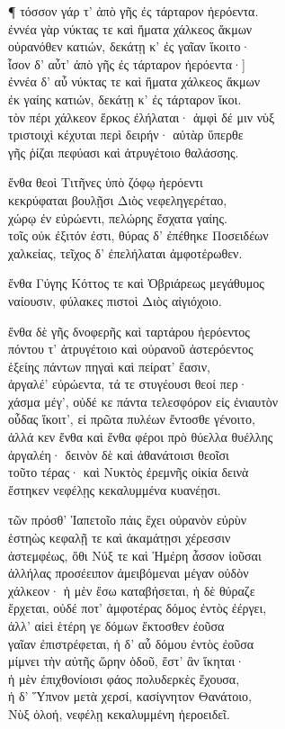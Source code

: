 ¶ τόσσον γάρ τ' ἀπὸ γῆς ἐς τάρταρον ἠερόεντα.\\
ἐννέα γὰρ νύκτας τε καὶ ἤματα χάλκεος ἄκμων\\
οὐρανόθεν κατιών, δεκάτῃ κ' ἐς γαῖαν ἵκοιτο· \\
\skipnumbering{[}ἶσον δ' αὖτ' ἀπὸ γῆς ἐς τάρταρον ἠερόεντα·{]}\\
ἐννέα δ' αὖ νύκτας τε καὶ ἤματα χάλκεος ἄκμων\\
ἐκ γαίης κατιών, δεκάτῃ κ' ἐς τάρταρον ἵκοι.  \\
τὸν πέρι χάλκεον ἕρκος ἐλήλαται· ἀμφὶ δέ μιν νὺξ \\
τριστοιχὶ κέχυται περὶ δειρήν· αὐτὰρ ὕπερθε\\
γῆς ῥίζαι πεφύασι καὶ ἀτρυγέτοιο θαλάσσης.

\quad{}ἔνθα θεοὶ Τιτῆνες ὑπὸ ζόφῳ ἠερόεντι\\
κεκρύφαται βουλῇσι Διὸς νεφεληγερέταο,  \\
χώρῳ ἐν εὐρώεντι, πελώρης ἔσχατα γαίης.\\
τοῖς οὐκ ἐξιτόν ἐστι, θύρας δ' ἐπέθηκε Ποσειδέων \\
χαλκείας, τεῖχος δ' ἐπελήλαται ἀμφοτέρωθεν.

\quad{}ἔνθα Γύγης Κόττος τε καὶ Ὀβριάρεως μεγάθυμος \\
ναίουσιν, φύλακες πιστοὶ Διὸς αἰγιόχοιο. 

\quad{}ἔνθα δὲ γῆς δνοφερῆς καὶ ταρτάρου ἠερόεντος \\
πόντου τ' ἀτρυγέτοιο καὶ οὐρανοῦ ἀστερόεντος\\
ἑξείης πάντων πηγαὶ καὶ πείρατ' ἔασιν,\\
ἀργαλέ' εὐρώεντα, τά τε στυγέουσι θεοί περ·\\
χάσμα μέγ', οὐδέ κε πάντα τελεσφόρον εἰς ἐνιαυτὸν \\
οὖδας ἵκοιτ', εἰ πρῶτα πυλέων ἔντοσθε γένοιτο,\\
ἀλλά κεν ἔνθα καὶ ἔνθα φέροι πρὸ θύελλα θυέλλης \\
ἀργαλέη· δεινὸν δὲ καὶ ἀθανάτοισι θεοῖσι \\
τοῦτο τέρας· καὶ Νυκτὸς ἐρεμνῆς οἰκία δεινὰ\\
ἕστηκεν νεφέλῃς κεκαλυμμένα κυανέῃσι.  

\quad{}τῶν πρόσθ' Ἰαπετοῖο πάις ἔχει οὐρανὸν εὐρὺν\\
ἑστηὼς κεφαλῇ τε καὶ ἀκαμάτῃσι χέρεσσιν\\
ἀστεμφέως, ὅθι Νύξ τε καὶ Ἡμέρη ἆσσον ἰοῦσαι\\
ἀλλήλας προσέειπον ἀμειβόμεναι μέγαν οὐδὸν \\
χάλκεον· ἡ μὲν ἔσω καταβήσεται, ἡ δὲ θύραζε  \\
ἔρχεται, οὐδέ ποτ' ἀμφοτέρας δόμος ἐντὸς ἐέργει,\\
ἀλλ' αἰεὶ ἑτέρη γε δόμων ἔκτοσθεν ἐοῦσα\\
γαῖαν ἐπιστρέφεται, ἡ δ' αὖ δόμου ἐντὸς ἐοῦσα \\
μίμνει τὴν αὐτῆς ὥρην ὁδοῦ, ἔστ' ἂν ἵκηται· \\
ἡ μὲν ἐπιχθονίοισι φάος πολυδερκὲς ἔχουσα,  \\
ἡ δ' Ὕπνον μετὰ χερσί, κασίγνητον Θανάτοιο, \\
Νὺξ ὀλοή, νεφέλῃ κεκαλυμμένη ἠεροειδεῖ.

